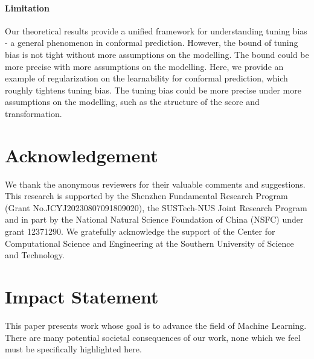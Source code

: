 \documentclass{article}
\newcommand{\1}{\mathbbm{1}}
\theoremstyle{plain}
\theoremstyle{definition}
\theoremstyle{remark}
\begin{document}
\paragraph{Limitation}
Our theoretical results provide a unified framework for understanding tuning bias - a general phenomenon in conformal prediction. 
However, the bound of tuning bias is not tight without more assumptions on the modelling. 
The bound could be more precise with more assumptions on the modelling. 
Here, we provide an example of regularization on the learnability for conformal prediction, which roughly tightens tuning bias. 
The tuning bias could be more precise under more assumptions on the modelling, such as the structure of the score and transformation. 


\section*{Acknowledgement}
We thank the anonymous reviewers for their valuable comments and suggestions. 
This research is supported by the Shenzhen Fundamental Research Program (Grant No.JCYJ20230807091809020), the SUSTech-NUS Joint Research Program and in part by the National Natural Science Foundation of China (NSFC) under grant 12371290. 
We gratefully acknowledge the support of the Center for Computational Science and Engineering at the Southern University of Science and Technology.


\section*{Impact Statement}
This paper presents work whose goal is to advance the field of Machine Learning. There are many potential societal consequences of our work, none which we feel must be specifically highlighted here.






\newpage
\appendix
\onecolumn
\end{document}
